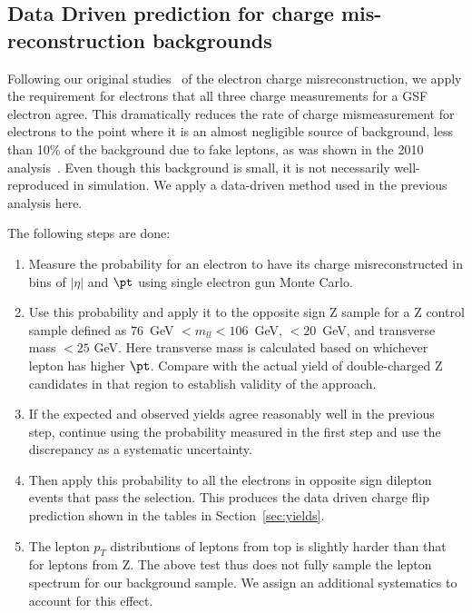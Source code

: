 \subsection{Data Driven prediction for charge mis-reconstruction backgrounds}
\label{sec:flips}


Following our original studies~\cite{ref:samesign} of the electron charge misreconstruction, 
we apply the requirement for electrons that all three charge measurements for a GSF electron agree. 
This dramatically reduces the rate of charge mismeasurement for electrons to the point where it 
is an almost negligible source of background, less than 10\% of the background due to fake leptons, 
as was shown in the 2010 analysis~\cite{ref:sus10004}.
Even though this background is small, it is not necessarily well-reproduced in simulation.
We apply a data-driven method used in the previous analysis here.

The following steps are done:
\begin{enumerate}
\item Measure the probability for an electron to have its charge misreconstructed 
in bins of $|\eta |$ and $\pt$ using single electron gun Monte Carlo.
\item Use this probability and apply it to the opposite sign Z sample for a Z control sample 
defined as $76$\ GeV $ < m_{ll} < 106$\ GeV,  \met $ < 20$\ GeV,
and transverse mass $< 25$ GeV. 
Here transverse mass is calculated based on whichever lepton has higher $\pt$. 
Compare with the actual yield of double-charged Z candidates in that region to establish validity of the approach.
\item If the expected and observed yields agree reasonably well in the previous step, continue using
	the probability measured in the first step and use the discrepancy as a systematic uncertainty.
\item Then apply this probability to all the electrons in opposite sign dilepton events that pass the selection. 
	This produces the data driven charge flip  prediction shown in the tables in Section~\ref{sec:yields}. 
\item The lepton $p_T$ distributions of leptons from top is slightly harder than that for leptons from Z. The above
test thus does not fully sample the lepton spectrum for our background sample. We assign an additional systematics
to account for this effect.
\end{enumerate}

